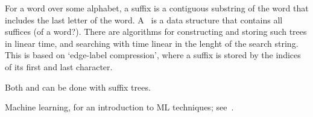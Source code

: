 For a word over some alphabet, a suffix is a contiguous substring of
the word that includes the last letter of the
word. A~ is a data structure that contains all
suffices (of a word?). There are algorithms for constructing and
storing such trees in linear time, and searching with time linear in
the lenght of the search string. This is based on `edge-label
compression', where a suffix is stored by the indices of its first and
last character.

Both 
 and  can
be done with suffix trees.

\begin{notready}
Machine learning, for an introduction to ML techniques; see~\cite{Tara:MLbiology}.
\end{notready}
